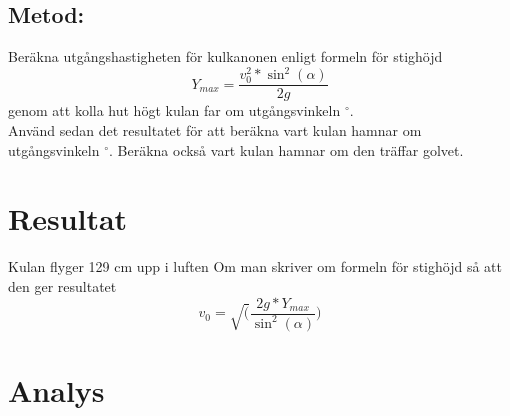 \documentclass[11p]{article}
\begin{document}
    \subsection{Metod:}
    Beräkna utgångshastigheten för kulkanonen enligt formeln för stighöjd
    \begin{equation}
        Y_{max} = \frac{v_0^2*\sin^2(\alpha)}{2g}
    \end{equation}
    genom att kolla hut högt kulan far om utgångsvinkeln \alpha {} $^{\circ}$. \\
    Använd sedan det resultatet för att beräkna vart kulan hamnar om utgångsvinkeln \alpha {} $^{\circ}$.
    Beräkna också vart kulan hamnar om den träffar golvet.
    \paragraph{}

    \section{Resultat}
    Kulan flyger 129 cm upp i luften
    Om man skriver om formeln för stighöjd så att den ger resultatet
    \begin{equation}
       v_0 = \sqrt(\frac{2g*Y_{max}}{\sin^2(\alpha)})
    \end{equation}

    \section{Analys}
\end{document}

